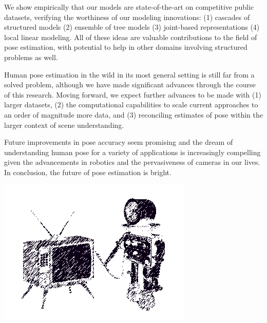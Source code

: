 We show empirically that our models are state-of-the-art on competitive public 
datasets, verifying the worthiness of our modeling innovations: (1) cascades of 
structured models (2) ensemble of tree models (3) joint-based representations 
(4) local linear modeling.  All of these ideas are valuable contributions to 
the field of pose estimation, with potential to help in other domains involving 
structured problems as well.

Human pose estimation in the wild in its most general setting is still far from 
a solved problem, although we have made significant advances through the course 
of this research.  Moving forward, we expect further advances to be made with 
(1) larger datasets, (2) the computational capabilities to scale current 
approaches to an order of magnitude more data, and (3) reconciling estimates of 
pose within the larger context of scene understanding.

Future improvements in pose accuracy seem promising and the dream of 
understanding human pose for a variety of applications is increasingly 
compelling given the advancements in robotics and the pervasiveness of cameras 
in our lives.  In conclusion, the future of pose estimation is bright.

\clearpage
\text{ } \vspace{3in}

\begin{center}
\includegraphics[width=0.150\linewidth]{figs/bot-tv.png}
\end{center}

